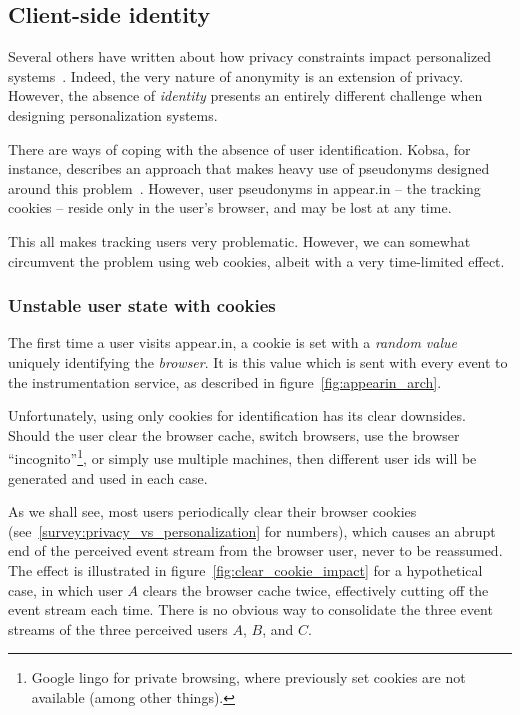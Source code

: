   \subsection{Client-side identity}
  \label{survey:client_side_identity}

    Several others have written about how privacy constraints impact personalized systems~\cite{Teltzrow2004,Kobsa2007}. Indeed, the very nature of anonymity is an extension of privacy. However, the absence of \emph{identity} presents an entirely different challenge when designing personalization systems.

    There are ways of coping with the absence of user identification. Kobsa, for instance, describes an approach that makes heavy use of pseudonyms designed around this problem~\cite{Kobsa2003}. However, user pseudonyms in appear.in -- the tracking cookies -- reside only in the user's browser, and may be lost at any time.

    This all makes tracking users very problematic. However, we can somewhat circumvent the problem using web cookies, albeit with a very time-limited effect.

    \subsubsection{Unstable user state with cookies}
    \label{survey:state_with_cookies}

      The first time a user visits appear.in, a cookie is set with a \emph{random value} uniquely identifying the \emph{browser}. It is this value which is sent with every event to the instrumentation service, as described in figure~\ref{fig:appearin_arch}.

      Unfortunately, using only cookies for identification has its clear downsides. Should the user clear the browser cache, switch browsers, use the browser ``incognito''\footnote{Google lingo for private browsing, where previously set cookies are not available (among other things).}, or simply use multiple machines, then different user ids will be generated and used in each case.

      As we shall see, most users periodically clear their browser cookies (see~\ref{survey:privacy_vs_personalization} for numbers), which causes an abrupt end of the perceived event stream from the browser user, never to be reassumed. The effect is illustrated in figure~\ref{fig:clear_cookie_impact} for a hypothetical case, in which user $A$ clears the browser cache twice, effectively cutting off the event stream each time. There is no obvious way to consolidate the three event streams of the three perceived users $A$, $B$, and $C$.

